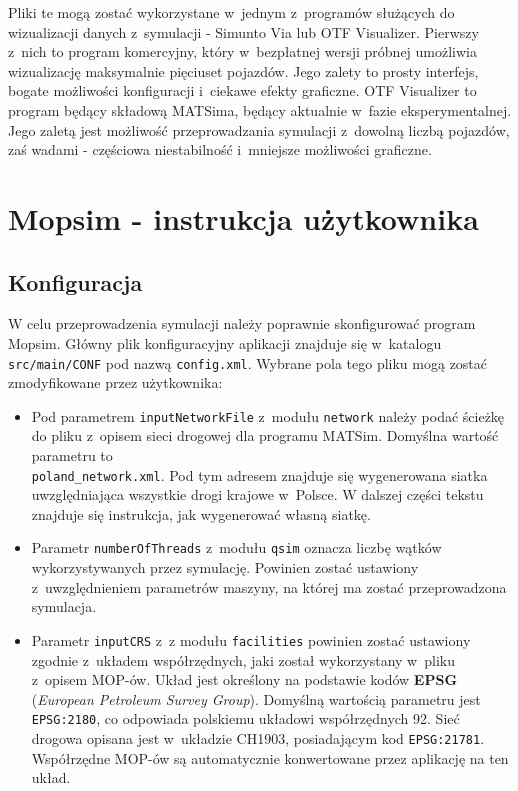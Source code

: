 Pliki te mogą zostać wykorzystane w~jednym z~programów służących do wizualizacji danych z~symulacji - Simunto Via lub OTF Visualizer. Pierwszy z~nich to program komercyjny, który w~bezpłatnej wersji próbnej umożliwia wizualizację maksymalnie pięciuset pojazdów. Jego zalety to prosty interfejs, bogate możliwości konfiguracji i~ciekawe efekty graficzne. OTF Visualizer to program będący składową MATSima, będący aktualnie w~fazie eksperymentalnej. Jego zaletą jest możliwość przeprowadzania symulacji z~dowolną liczbą pojazdów, zaś wadami - częściowa niestabilność i~mniejsze możliwości graficzne.

\section[Instrukcja użytkownika]{Mopsim - instrukcja użytkownika}
\subsection{Konfiguracja}
W celu przeprowadzenia symulacji należy poprawnie skonfigurować program Mopsim. Główny plik konfiguracyjny aplikacji znajduje się w~katalogu \texttt{src/main/CONF} pod nazwą \texttt{config.xml}. Wybrane pola tego pliku mogą zostać zmodyfikowane przez użytkownika:
\begin{itemize}
\item Pod parametrem \texttt{inputNetworkFile} z~modułu \texttt{network} należy podać ścieżkę do pliku z~opisem sieci drogowej dla programu MATSim. Domyślna wartość parametru to \\\texttt{poland\_network.xml}. Pod tym adresem znajduje się wygenerowana siatka uwzględniająca wszystkie drogi krajowe w~Polsce. W dalszej części tekstu znajduje się instrukcja, jak wygenerować własną siatkę.
\item Parametr \texttt{numberOfThreads} z~modułu \texttt{qsim} oznacza liczbę wątków wykorzystywanych przez symulację. Powinien zostać ustawiony z~uwzględnieniem parametrów maszyny, na której ma zostać przeprowadzona symulacja.
\item Parametr \texttt{inputCRS} z~z modułu \texttt{facilities} powinien zostać ustawiony zgodnie z~układem współrzędnych, jaki został wykorzystany w~pliku z~opisem MOP-ów. Układ jest określony na podstawie kodów \textbf{EPSG} (\textit{European Petroleum Survey Group}). Domyślną wartością parametru jest \texttt{EPSG:2180}, co odpowiada polskiemu układowi współrzędnych 92. Sieć drogowa opisana jest w~układzie CH1903, posiadającym kod \texttt{EPSG:21781}. Współrzędne MOP-ów są automatycznie konwertowane przez aplikację na ten układ.
\end{itemize}
